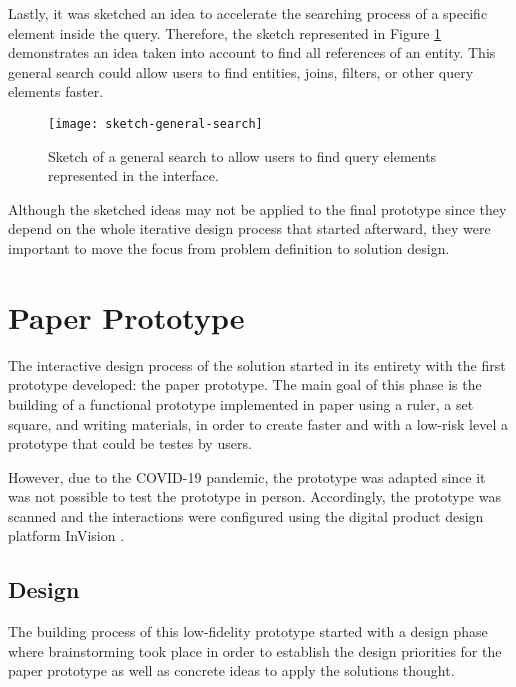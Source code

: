Lastly, it was sketched an idea to accelerate the searching process of a specific element inside the query. Therefore, the sketch represented in Figure \ref{fig:sketchGeneralSearch} demonstrates an idea taken into account to find all references of an entity. This general search could allow users to find entities, joins, filters, or other query elements faster.

\begin{figure}[htbp]
	\centering
	\texttt{[image: sketch-general-search]}
	\caption{Sketch of a general search to allow users to find query elements represented in the interface.}
	\label{fig:sketchGeneralSearch}
\end{figure}

Although the sketched ideas may not be applied to the final prototype since they depend on the whole iterative design process that started afterward, they were important to move the focus from problem definition to solution design.


\section{Paper Prototype}
\label{sec:paper_prototype}
The interactive design process of the solution started in its entirety with the first prototype developed: the paper prototype. The main goal of this phase is the building of a functional prototype implemented in paper using a ruler, a set square, and writing materials, in order to create faster and with a low-risk level a prototype that could be testes by users.

However, due to the COVID-19 pandemic, the prototype was adapted since it was not possible to test the prototype in person. Accordingly, the prototype was scanned and the interactions were configured using the digital product design platform InVision \cite{invision}.

\subsection{Design}
\label{subsec:paper_prototype_design}
The building process of this low-fidelity prototype started with a design phase where brainstorming took place in order to establish the design priorities for the paper prototype as well as concrete ideas to apply the solutions thought.

